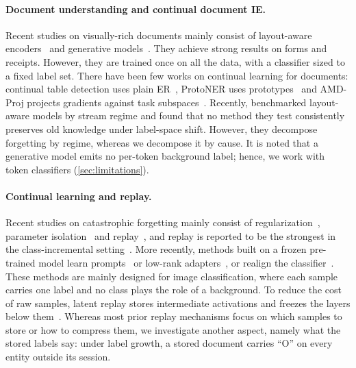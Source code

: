 \documentclass[10pt,twocolumn,letterpaper]{article}
\begin{document}
\paragraph{Document understanding and continual document IE.} Recent studies on visually-rich documents mainly consist of layout-aware encoders~\citep{xu2020layoutlm,xu2021layoutlmv2,huang2022layoutlmv3,wang2022lilt,hong2022bros} and generative models~\citep{kim2022donut,tang2023udop}. They achieve strong results on forms and receipts. However, they are trained once on all the data, with a classifier sized to a fixed label set. There have been few works on continual learning for documents: continual table detection uses plain ER~\citep{minouei2022table}, ProtoNER uses prototypes~\citep{kumar2023protoner} and AMD-Proj projects gradients against task subspaces~\citep{sassioui2026amdproj}. Recently, \citet{sassioui2026documents} benchmarked layout-aware models by stream regime and found that no method they test consistently preserves old knowledge under label-space shift. However, they decompose forgetting by regime, whereas we decompose it by cause. It is noted that a generative model emits no per-token background label; hence, we work with token classifiers (\cref{sec:limitations}).

\paragraph{Continual learning and replay.} Recent studies on catastrophic forgetting mainly consist of regularization~\citep{kirkpatrick2017ewc,li2017lwf}, parameter isolation~\citep{mallya2018packnet,rusu2016pnn} and replay~\citep{rolnick2019er,buzzega2020der}, and replay is reported to be the strongest in the class-incremental setting~\citep{masana2022class}. More recently, methods built on a frozen pre-trained model learn prompts~\citep{wang2022l2p,smith2023coda} or low-rank adapters~\citep{liang2024inflora,he2025cllora}, or realign the classifier~\citep{zhang2023slca,mcdonnell2023ranpac}. These methods are mainly designed for image classification, where each sample carries one label and no class plays the role of a background. To reduce the cost of raw samples, latent replay stores intermediate activations and freezes the layers below them~\citep{hayes2020remind,pellegrini2020latent}. Whereas most prior replay mechanisms focus on which samples to store or how to compress them, we investigate another aspect, namely what the stored labels say: under label growth, a stored document carries ``O'' on every entity outside its session.
\end{document}
